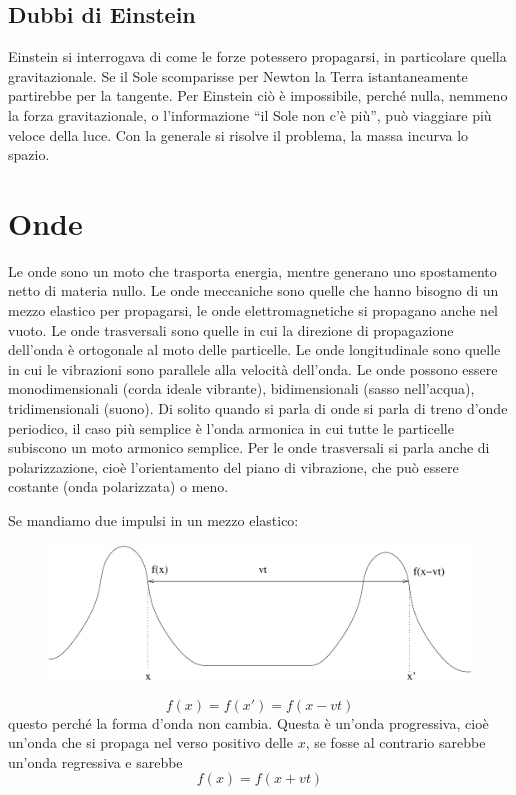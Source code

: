 \section{Dubbi di Einstein}
Einstein si interrogava di come le forze potessero propagarsi, in particolare quella gravitazionale. Se il Sole scomparisse per Newton la Terra istantaneamente partirebbe per la tangente. Per Einstein ciò è impossibile, perché nulla, nemmeno la forza gravitazionale, o l'informazione ``il Sole non c'è più'', può viaggiare più veloce della luce. Con la generale si risolve il problema, la massa incurva lo spazio.

\chapter{Onde}
\minitoc
Le onde sono un moto che trasporta energia, mentre generano uno spostamento netto di materia nullo. Le onde meccaniche sono quelle che hanno bisogno di un mezzo elastico per propagarsi, le onde elettromagnetiche si propagano anche nel vuoto. Le onde trasversali sono quelle in cui la direzione di propagazione dell'onda è ortogonale al moto delle particelle. Le onde longitudinale sono quelle in cui le vibrazioni sono parallele alla velocità dell'onda. Le onde possono essere monodimensionali (corda ideale vibrante), bidimensionali (sasso nell'acqua), tridimensionali (suono). Di solito quando si parla di onde si parla di treno d'onde periodico, il caso più semplice è l'onda armonica in cui tutte le particelle subiscono un moto armonico semplice. Per le onde trasversali si parla anche di polarizzazione, cioè l'orientamento del piano di vibrazione, che può essere costante (onda polarizzata) o meno.

Se mandiamo due impulsi in un mezzo elastico:
\begin{figure}[htbp]
   \centering
   \includegraphics[scale=0.5]{immagini/fisica1/Onda1}
\end{figure}
\[f(x)=f(x')=f(x-vt)\]
questo perché la forma d'onda non cambia. Questa è un'onda progressiva, cioè un'onda che si propaga nel verso positivo delle $x$, se fosse al contrario sarebbe un'onda regressiva e sarebbe
\[f(x)=f(x+vt)\]
